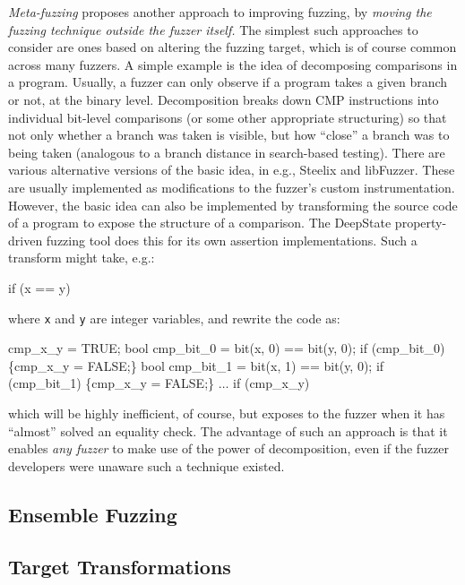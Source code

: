 \documentclass[numbers]{proposalnsf}
\begin{document}
\emph{Meta-fuzzing} proposes another approach to improving fuzzing, by \emph{moving the fuzzing technique outside the fuzzer itself.}  The simplest such approaches to consider are ones based on altering the fuzzing target, which is of course common across many fuzzers.  A simple example is the idea of decomposing comparisons in a program.  Usually, a fuzzer can only observe if a program takes a given branch or not, at the binary level.  Decomposition breaks down CMP instructions into individual bit-level comparisons (or some other appropriate structuring) so that not only whether a branch was taken is visible, but how ``close'' a branch was to being taken (analogous to a branch distance in search-based testing).  There are various alternative versions of the basic idea, in e.g., Steelix and libFuzzer.  These are usually implemented as modifications to the fuzzer's custom instrumentation.  However, the basic idea can also be implemented by transforming the source code of a program to expose the structure of a comparison.  The DeepState property-driven fuzzing tool does this for its own assertion implementations.  Such a transform might take, e.g.:

\begin{code}

if (x == y)
\end{code}

\noindent where {\tt x} and {\tt y} are integer variables, and rewrite the code as:

\begin{code}
cmp\_x\_y = TRUE;
bool cmp\_bit\_0 = bit(x, 0) == bit(y, 0);
if (cmp\_bit\_0) \{cmp\_x\_y = FALSE;\}
bool cmp\_bit\_1 = bit(x, 1) == bit(y, 0);
if (cmp\_bit\_1) \{cmp\_x\_y = FALSE;\}
$\ldots$
if (cmp\_x\_y)
\end{code}

\noindent which will be highly inefficient, of course, but exposes to the fuzzer when it has ``almost'' solved an equality check.  The advantage of such an approach is that it enables \emph{any fuzzer} to make use of the power of decomposition, even if the fuzzer developers were unaware such a technique existed.
  
\subsection{Ensemble Fuzzing}

\subsection{Target Transformations}
\end{document}
